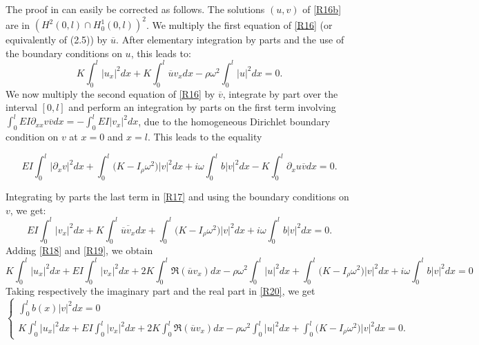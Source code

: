 \documentclass[10pt, english]{article}
\begin{document}
{The proof in \cite{AB2023I} can easily be corrected as follows.  The solutions $(u,v)$ of \eqref{R16b} are in $(H^2(0,l) \cap H^1_0(0,l))^2$. We multiply the first equation of \eqref{R16} (or equivalently of (2.5)) by $\overline{u}$. After elementary integration by parts and the use of the boundary conditions on $u$, this leads to:
\begin{equation}\label{R18}%
K\int_0^l |u_x|^2 dx +K \int_0^l \overline{u}v_xdx  -\rho\omega^2 \int_0^l |u|^2dx=0.
\end{equation}
We now multiply the second equation of \eqref{R16} by $\overline{v}$, integrate by part over the interval $[0,l]$ and perform an integration by parts on the first term involving $\int_0^l EI\partial_{xx}v\overline{v}dx=-\int_0^l EI \Big|v_x\Big|^2dx$, due to the homogeneous Dirichlet boundary condition on $v$ at $x=0$ and $x=l$. This leads to the equality

\begin{equation}\label{R17}%
EI\int_0^l \Big|\partial_xv\Big|^2 dx + \int_0^l \Big(K-I_{\rho}\omega^2\Big)|v|^2dx +i\omega \int_0^l b|v|^2dx -K \int_0^l \partial_xu \overline{v}dx=0.
\end{equation}

Integrating by parts the last term in \eqref{R17} and using the boundary conditions on $v$, we get:
\begin{equation}\label{R19}%
EI\int_0^l |v_x|^2 dx + K \int_0^l \overline{\overline{u}v_x}dx +
\int_0^l \Big(K-I_{\rho}\omega^2\Big)|v|^2dx +i\omega \int_0^l b|v|^2dx =0.
\end{equation}
Adding \eqref{R18} and \eqref{R19}, we obtain
\begin{equation}\label{R20}%
K\int_0^l |u_x|^2 dx + EI\int_0^l |v_x|^2 dx + 2K \int_0^l \Re(\overline{u}v_x)dx - \rho\omega^2 \int_0^l |u|^2dx +
\int_0^l \Big(K-I_{\rho}\omega^2\Big)|v|^2dx +i\omega \int_0^l b|v|^2dx =0
\end{equation}
Taking respectively the imaginary part and the real part in \eqref{R20}, we get
\begin{equation}\label{R21}%
\begin{cases}
\int_0^l b(x)|v|^2dx =0\,\\
 K\int_0^l |u_x|^2 dx + EI\int_0^l |v_x|^2 dx + 2K \int_0^l \Re(\overline{u}v_x)dx - \rho\omega^2 \int_0^l |u|^2dx +
\int_0^l \Big(K-I_{\rho}\omega^2\Big)|v|^2dx =0.
\end{cases}
\end{equation}

}
\end{document}
